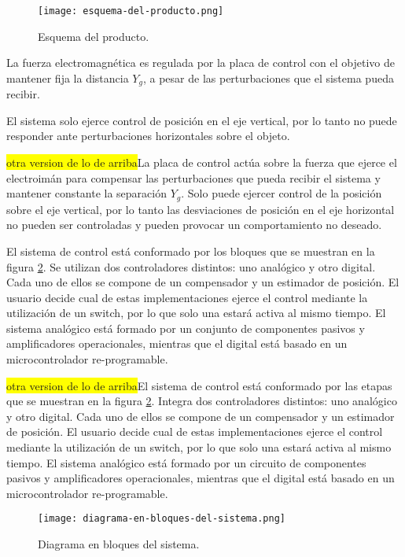 \begin{figure}[H]
	\centering
	\texttt{[image: esquema-del-producto.png]}
	\caption{Esquema del producto.}
	\label{fig:img_Esquema-del-producto}
\end{figure}

\noindent La fuerza electromagnética es regulada por la placa de control con el objetivo de mantener fija la distancia $Y_{g}$, a pesar de las perturbaciones que el sistema pueda recibir. 

\noindent El sistema solo ejerce control de posición en el eje vertical, por lo tanto no puede responder ante perturbaciones horizontales sobre el objeto.

\colorbox{yellow}{otra version de lo de arriba}La placa de control actúa sobre la fuerza que ejerce el electroimán para compensar las perturbaciones que pueda recibir el sistema y mantener constante la separación $Y_{g}$. Solo puede ejercer control de la posición sobre el eje vertical, por lo tanto las desviaciones de posición en el eje horizontal no pueden ser controladas y pueden provocar un comportamiento no deseado.

\noindent El sistema de control está conformado por los bloques que se muestran en la figura \ref{fig:img_diagrama-en-bloques-del-sistema}. Se utilizan dos controladores distintos: uno analógico y otro digital. Cada uno de ellos se compone de un compensador y un estimador de posición.  El usuario decide cual de estas implementaciones ejerce el control mediante la utilización de un switch, por lo que solo una estará activa al mismo tiempo. El sistema analógico está formado por un conjunto de componentes pasivos y amplificadores operacionales, mientras que el digital está basado en un microcontrolador re-programable.

\colorbox{yellow}{otra version de lo de arriba}El sistema de control está conformado por las etapas que se muestran en la figura \ref{fig:img_diagrama-en-bloques-del-sistema}. Integra dos controladores distintos: uno analógico y otro digital. Cada uno de ellos se compone de un compensador y un estimador de posición.  El usuario decide cual de estas implementaciones ejerce el control mediante la utilización de un switch, por lo que solo una estará activa al mismo tiempo. El sistema analógico está formado por un circuito de  componentes pasivos y amplificadores operacionales, mientras que el digital está basado en un microcontrolador re-programable.

\begin{figure}[H]
	\centering
	\texttt{[image: diagrama-en-bloques-del-sistema.png]}
	\caption{Diagrama en bloques del sistema.}
	\label{fig:img_diagrama-en-bloques-del-sistema}
\end{figure}

